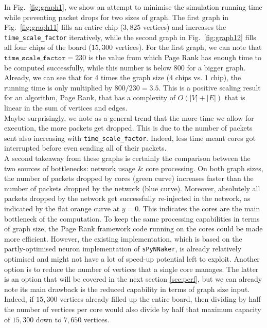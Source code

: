 In Fig.~\ref{fig:graph1}, we show an attempt to minimise the simulation running time while preventing packet drops for two sizes of graph. The first graph in Fig.~\ref{fig:graph11} fills an entire chip ($3,825$ vertices) and increases the \texttt{time\_scale\_factor} iteratively, while the second graph in Fig.~\ref{fig:graph12} fills all four chips of the board ($15,300$ vertices). For the first graph, we can note that $\texttt{time\_scale\_factor} = 230$ is the value from which Page Rank has enough time to be computed successfully, while this number is below $800$ for a bigger graph. Already, we can see that for 4 times the graph size (4 chips vs. 1 chip), the running time is only multiplied by $800/230 = 3.5$. This is a positive scaling result for an algorithm, Page Rank, that has a complexity of $O(|V|+|E|)$ that is linear in the sum of vertices and edges. \\

Maybe surprisingly, we note as a general trend that the more time we allow for execution, the more packets get dropped. This is due to the number of packets sent also increasing with \texttt{time\_scale\_factor}. Indeed, less time meant cores got interrupted before even sending all of their packets. \\

A second takeaway from these graphs is certainly the comparison between the two sources of bottlenecks: network usage \& core processing. On both graph sizes, the number of packets dropped by cores (green curve) increases faster than the number of packets dropped by the network (blue curve). Moreover, absolutely all packets dropped by the network get successfully re-injected in the network, as indicated by the flat orange curve at $y=0$. This indicates the cores are the main bottleneck of the computation. To keep the same processing capabilities in terms of graph size, the Page Rank framework code running on the cores could be made more efficient. However, the existing implementation, which is based on the partly-optimised neuron implementation of \texttt{sPyNNaker}, is already relatively optimised and might not have a lot of speed-up potential left to exploit. Another option is to reduce the number of vertices that a single core manages. The latter is an option that will be covered in the next section \ref{sec:perf}, but we can already note its main drawback is the reduced capability in terms of graph size input. Indeed, if $15,300$ vertices already filled up the entire board, then dividing by half the number of vertices per core would also divide by half that maximum capacity of $15,300$ down to $7,650$ vertices. \\

